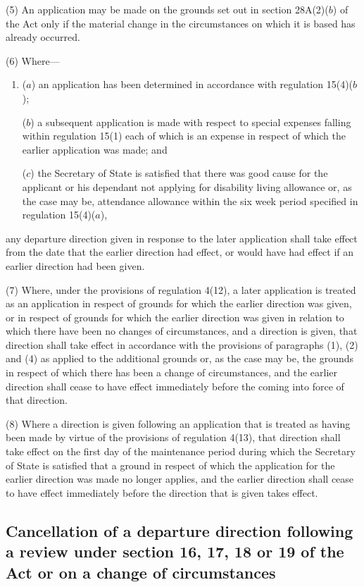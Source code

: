 \documentclass[a4paper]{article}
\begin{document}
(5) An application may be made on the grounds set out in section 28A(2)($b$) of
the Act only if the material change in the circumstances on which it is based
has already occurred.

(6) Where—
\begin{enumerate}\item[]
($a$) an application has been determined in accordance with regulation 15(4)($b$);

($b$) a subsequent application is made with respect to special expenses falling
within regulation 15(1) each of which is an expense in respect of which the
earlier application was made; and

($c$) the Secretary of State is satisfied that there was good cause for the
applicant or his dependant not applying for disability living allowance or, as
the case may be, attendance allowance within the six week period specified in
regulation 15(4)($a$),
\end{enumerate}
any departure direction given in response to the later application shall take
effect from the date that the earlier direction had effect, or would have had
effect if an earlier direction had been given.

(7) Where, under the provisions of regulation 4(12), a later application is
treated as an application in respect of grounds for which the earlier direction
was given, or in respect of grounds for which the earlier direction was given in
relation to which there have been no changes of circumstances, and a direction
is given, that direction shall take effect in accordance with the provisions of
paragraphs (1), (2) and (4) as applied to the additional grounds or, as the case
may be, the grounds in respect of which there has been a change of
circumstances, and the earlier direction shall cease to have effect immediately
before the coming into force of that direction.

(8) Where a direction is given following an application that is treated as
having been made by virtue of the provisions of regulation 4(13), that direction
shall take effect on the first day of the maintenance period during which the
Secretary of State is satisfied that a ground in respect of which the
application for the earlier direction was made no longer applies, and the
earlier direction shall cease to have effect immediately before the direction
that is given takes effect.

\subsection[33. Cancellation of a departure direction following a review under section 16, 17,
18 or 19 of the Act or on a change of circumstances]{Cancellation of a departure direction following a review under section 16, 17,
18 or 19 of the Act or on a change of circumstances}
\end{document}
